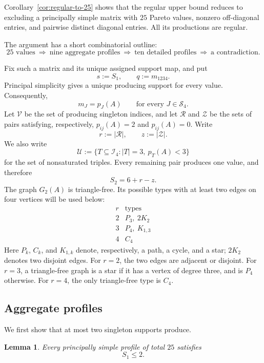 \documentclass[11pt,a4paper]{article}
\newtheorem{lemma}[theorem]{Lemma}
\theoremstyle{definition}
\newcommand{\Ind}{\mathcal I}
\newcommand{\Supp}{\mathscr S}
\begin{document}
Corollary~\ref{cor:regular-to-25} shows that the regular upper bound
reduces to excluding a principally simple matrix with $25$ Pareto
values, nonzero off-diagonal entries, and pairwise distinct diagonal
entries. All its productions are regular.

The argument has a short combinatorial outline:
$$
\text{$25$ values}
\ \Longrightarrow\
\text{nine aggregate profiles}
\ \Longrightarrow\
\text{ten detailed profiles}
\ \Longrightarrow\
\text{a contradiction}.
$$

Fix such a matrix and its unique assigned support map, and put
$$
s:=S_1,\qquad q:=m_{1234}.
$$
Principal simplicity gives a unique producing support for every value.
Consequently,
$$
m_J=p_J(A)
\qquad
\text{for every }J\in\Supp_4.
$$
Let $\mathcal V$ be the set of producing singleton indices, and let
$\mathcal R$ and $\mathcal Z$ be the sets of pairs satisfying,
respectively, $p_{ij}(A)=2$ and $p_{ij}(A)=0$. Write
$$
r:=|\mathcal R|,
\qquad
z:=|\mathcal Z|.
$$
We also write
$$
\mathcal U:=\{T\subseteq\Ind_4:|T|=3,\ p_T(A)<3\}
$$
for the set of nonsaturated triples.
Every remaining pair produces one value, and therefore
$$
S_2=6+r-z.
$$
The graph $G_2(A)$ is triangle-free. Its possible types with at least
two edges on four vertices will be used below:
$$
\begin{array}{c|c}
r&\text{types}\\
\hline
2&P_3,\ 2K_2\\
3&P_4,\ K_{1,3}\\
4&C_4
\end{array}
$$
Here $P_k$, $C_k$, and $K_{1,k}$ denote, respectively, a path, a
cycle, and a star; $2K_2$ denotes two disjoint edges.
For $r=2$, the two edges are adjacent or disjoint. For $r=3$, a
triangle-free graph is a star if it has a vertex of degree three, and is
$P_4$ otherwise. For $r=4$, the only triangle-free type is $C_4$.

\subsection{Aggregate profiles}

We first show that at most two singleton supports produce.

\begin{lemma}
\label{lem:S1-at-most-two}
Every principally simple profile of total $25$ satisfies
$$
S_1\leq2.
$$
\end{lemma}
\end{document}
